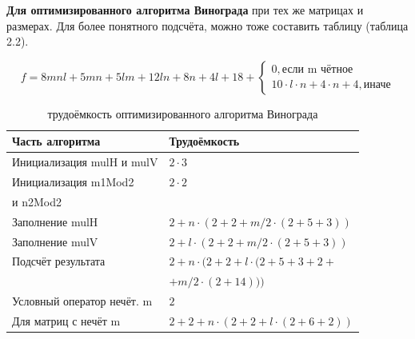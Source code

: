 \documentclass[12pt,a4paper]{report}
\begin{document}
\textbf{Для оптимизированного алгоритма Винограда} при тех же матрицах и размерах. 
Для более понятного подсчёта, можно тоже составить таблицу (таблица 2.2).

\begin{displaymath}
    f = 8mnl + 5mn + 5lm + 12ln + 8n + 4l + 18 + \left \{ 
    \begin{array}{ll}  
        0, \textrm{если m чётное} \\ 
        10 \cdot l \cdot n + 4 \cdot n + 4, \textrm{иначе} 
    \end{array} \right.
\end{displaymath}

\begin{table}[h]
\caption{трудоёмкость оптимизированного алгоритма Винограда}  
\label{tabular:timesandtenses}
\begin{center}
\begin{tabular}{ | l | l | }
\hline
        Часть алгоритма               & Трудоёмкость                                                            \\ \hline
        Инициализация mulH и mulV     & $2 \cdot 3$                                                             \\ \hline
        Инициализация m1Mod2          & $2 \cdot 2$                                                             \\
        и n2Mod2                      &                                                                         \\ \hline
        Заполнение mulH               & $2 + n \cdot (2 + 2 + m / 2 \cdot (2 + 5 + 3))$                         \\ \hline
        Заполнение mulV               & $2 + l \cdot (2 + 2 + m / 2 \cdot (2 + 5 + 3))$                         \\ \hline
        Подсчёт результата            & $2 + n \cdot (2 + 2 + l \cdot (2 + 5 + 3 + 2 + $                        \\
                                      & $ + m / 2 \cdot (2 + 14)))$                                             \\ \hline
        Условный оператор нечёт. m    & $2$                                                                     \\ \hline
        Для матриц с нечёт m          & $2 + 2 + n \cdot (2 + 2 + l \cdot (2 + 6 + 2))$                         \\ \hline
\end{tabular}
\end{center}
\end{table}
\end{document}
